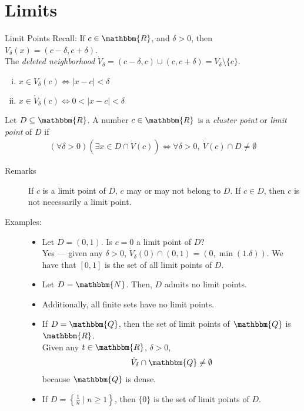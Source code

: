 \documentclass[10pt]{extarticle}
\newcommand{\N}{\mathbbm{N}}
\newcommand{\Q}{\mathbbm{Q}}
\newcommand{\R}{\mathbbm{R}}
\begin{document}
  \section{Limits}%
  \begin{problem}{Limit Points}
    Recall: If $c\in\R$, and $\delta > 0$, then $V_{\delta}(x) = (c-\delta, c+\delta)$.\\

    The \textit{deleted neighborhood} $\dot{V}_{\delta} = (c-\delta,c) \cup (c,c+\delta) = V_{\delta}\setminus \{c\}$.
    \begin{enumerate}[(i)]
      \item $x\in V_{\delta}(c) \Leftrightarrow |x-c| < \delta$
      \item $x\in \dot{V}_{\delta}(c) \Leftrightarrow 0 < |x-c| < \delta$
    \end{enumerate}
    Let $D \subseteq \R$. A number $c\in\R$ is a \textit{cluster point} or \textit{limit point} of $D$ if 
    \begin{align*}
      (\forall \delta > 0)(\exists x\in D \cap \dot{V}(c)) \Leftrightarrow \forall \delta > 0,~\dot{V}(c)\cap D \neq \emptyset
    \end{align*}
    \begin{description}
      \item[Remarks] If $c$ is a limit point of $D$, $c$ may or may not belong to $D$. If $c\in D$, then $c$ is not necessarily a limit point.
      \item[Examples:]\hfill
        \begin{itemize}
          \item Let $D = (0,1)$. Is $c = 0$ a limit point of $D$?\\

            Yes --- given any $\delta > 0$, $\dot{V}_{\delta}(0) \cap (0,1) = (0,\min(1.\delta))$. We have that $[0,1]$ is the set of all limit points of $D$.
          \item Let $D = \N$. Then, $D$ admits no limit points.
          \item Additionally, all finite sets have no limit points.
          \item If $D = \Q$, then the set of limit points of $\Q$ is $\R$.\\

            Given any $t\in\R$, $\delta > 0$,
            \begin{align*}
              \dot{V}_{\delta} \cap \Q \neq \emptyset
            \end{align*}
            because $\Q$ is dense.
          \item If $D = \left\{\frac{1}{n}\mid n\geq 1\right\}$, then $\{0\}$ is the set of limit points of $D$.
        \end{itemize}
    \end{description}
  \end{problem}
\end{document}
